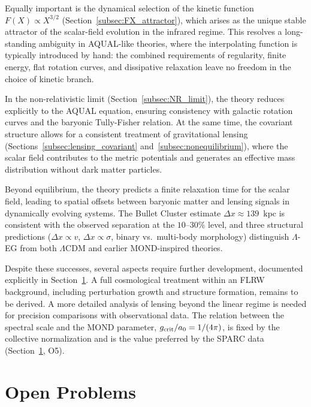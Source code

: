 \documentclass[11pt,a4paper]{article}
\begin{document}
Equally important is the dynamical selection of the kinetic function
$F(X) \propto X^{3/2}$ (Section~\ref{subsec:FX_attractor}), which arises as
the unique stable attractor of the scalar-field evolution in the infrared regime.
This resolves a long-standing ambiguity in AQUAL-like theories, where the
interpolating function is typically introduced by hand: the combined requirements
of regularity, finite energy, flat rotation curves, and dissipative relaxation
leave no freedom in the choice of kinetic branch.

In the non-relativistic limit (Section~\ref{subsec:NR_limit}), the theory
reduces explicitly to the AQUAL equation, ensuring consistency with galactic
rotation curves and the baryonic Tully-Fisher relation. At the same time,
the covariant structure allows for a consistent treatment of gravitational
lensing (Sections~\ref{subsec:lensing_covariant} and~\ref{subsec:nonequilibrium}),
where the scalar field contributes to the metric potentials and generates an
effective mass distribution without dark matter particles.

Beyond equilibrium, the theory predicts a finite relaxation time for the
scalar field, leading to spatial offsets between baryonic matter and
lensing signals in dynamically evolving systems. The Bullet Cluster estimate
$\Delta x\approx 139$~kpc is consistent with the observed separation at the
$10$--$30\%$ level, and three structural predictions ($\Delta x\propto v$,
$\Delta x\propto\sigma$, binary vs.\ multi-body morphology) distinguish
$\Lambda$-EG from both $\Lambda$CDM and earlier MOND-inspired theories.

Despite these successes, several aspects require further development,
documented explicitly in Section~\ref{sec:openproblems}. A full cosmological
treatment within an FLRW background, including perturbation growth and structure
formation, remains to be derived. A more detailed analysis of lensing beyond
the linear regime is needed for precision comparisons with observational data.
The relation between the spectral scale and the MOND parameter,
$g_{\rm crit}/a_0 = 1/(4\pi)$, is fixed by the collective normalization and is
the value preferred by the SPARC data (Section~\ref{sec:openproblems}, O5).

\section{Open Problems}
\label{sec:openproblems}
\end{document}
